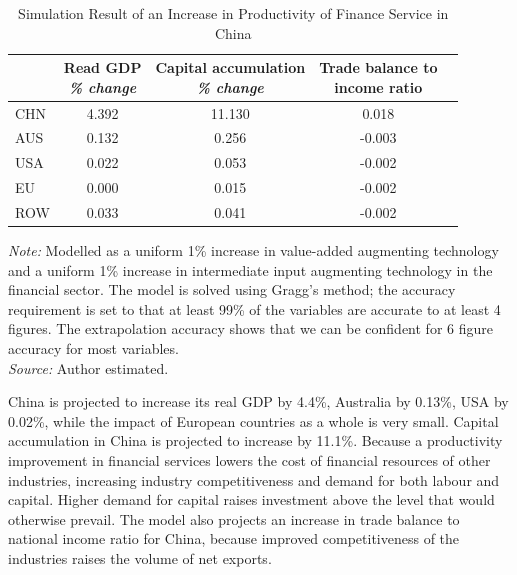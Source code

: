 \documentclass[AER]{AEA}
\begin{document}
\begin{table}[!htb]
\begin{threeparttable}
\caption{Simulation Result of an Increase in 
Productivity of Finance Service in China}
\label{tab:sim-pfin}
\def\theadset{\def\arraytretch{1.5}}
\def\arraystretch{1.2}
\small
\begin{tabular}{lcccc}
\hline\hline
    & \thead{Read GDP\\\emph{\% change}} 
    & \thead{Capital accumulation\\\emph{\% change}} 
    & \thead{Trade balance to\\income ratio} \\
\hline
CHN & 4.392 &	11.130 & 0.018 \\
AUS & 0.132 &	0.256 & -0.003 \\
USA & 0.022 &	0.053 & -0.002 \\
EU  & 0.000 &	0.015 & -0.002 \\
ROW & 0.033 &	0.041 & -0.002 \\
\hline\hline
\end{tabular}
\begin{tablenotes}
\emph{Note:} Modelled as a uniform 1\% increase in value-added augmenting 
technology and a uniform 1\% increase in intermediate input augmenting 
technology in the financial sector.
The model is solved using Gragg's method; the accuracy requirement is set 
to that at least 99\% of the variables are accurate to at least 4 figures. 
The extrapolation accuracy shows that we can be confident for 6 figure 
accuracy for most variables.\\
\emph{Source:} Author estimated.
\end{tablenotes}
\end{threeparttable}
\end{table}

China is projected to increase its real GDP by 4.4\%, 
Australia by 0.13\%, USA by 0.02\%, 
while the impact of European countries as a whole is very small. 
Capital accumulation in China is projected to increase by 11.1\%.
Because a productivity improvement in financial services lowers the cost of 
financial resources of other industries, increasing industry competitiveness 
and demand for both labour and capital. 
Higher demand for capital raises investment above the level 
that would otherwise prevail. 
The model also projects an increase in trade balance to national income ratio 
for China, because improved competitiveness of the industries raises the volume 
of net exports. \\
\end{document}
